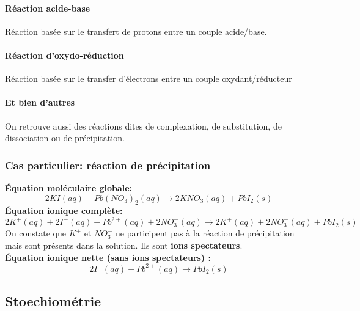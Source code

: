 \documentclass[10pt,a4paper]{book}
\begin{document}
\paragraph{Réaction acide-base} Réaction basée sur le transfert de protons entre un couple acide/base.
\paragraph{Réaction d'oxydo-réduction} Réaction basée sur le transfer d'électrons entre un couple oxydant/réducteur
\paragraph{Et bien d'autres} On retrouve aussi des réactions dites de complexation, de substitution, de dissociation ou de précipitation.

\subsubsection{Cas particulier: réaction de précipitation}

\textbf{Équation moléculaire globale:}
\begin{displaymath}
2KI(aq) + Pb(NO_3)_2(aq) \longrightarrow 2KNO_3(aq) + PbI_2(s)
\end{displaymath}
\textbf{Équation ionique complète:}
\begin{displaymath}
2K^+(aq) + 2I^-(aq) + Pb^{2+}(aq) + 2NO_3^-(aq) \longrightarrow 2K^+ (aq) + 2 NO_3^-(aq) + PbI_2(s)
\end{displaymath}
On constate que $K^+$ et $NO_3^-$ ne participent pas à la réaction de précipitation mais sont présents dans la solution. Ils sont \textbf{ions spectateurs}. \vspace{0.2cm} \\
\textbf{Équation ionique nette (sans ions spectateurs) :}
\begin{displaymath}
2I^-(aq) + Pb^{2+}(aq) \longrightarrow PbI_2(s)
\end{displaymath}

\subsection{Stoechiométrie}
\end{document}
